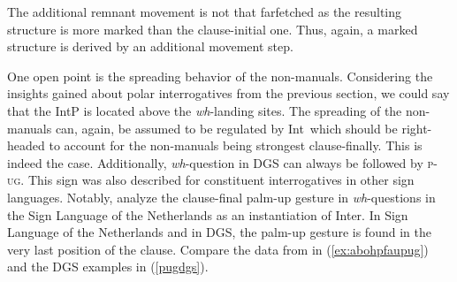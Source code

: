 %
%
%
%

\newpage 
\noindent The additional remnant movement is not that farfetched as the resulting structure is more marked than the clause-initial one. Thus, again, a marked structure is derived by an additional movement step.

One open point is the spreading behavior of the non-manuals. Considering the insights gained about polar interrogatives from the previous section, we could say that the IntP is located above the \textit{wh}-landing sites. The spreading of the non-manuals can, again, be assumed to be regulated by Int\textdegree\ which should be right-headed to account for the non-manuals being strongest clause-finally. This is indeed the case. Additionally, \textit{wh}-question in DGS can always be followed by \textsc{p-ug}. This sign was also described for constituent interrogatives in other sign languages. Notably, \citet{aboh2010sa} analyze the clause-final palm-up gesture in \textit{wh}-questions in the Sign Language of the Netherlands as an instantiation of Inter\textdegree . In Sign Language of the Netherlands and in DGS, the palm-up gesture is found in the very last position of the clause. Compare the data from \citet[111]{aboh2010sa} in (\ref{ex:abohpfaupug}) and the DGS examples in (\ref{pugdgs}).

